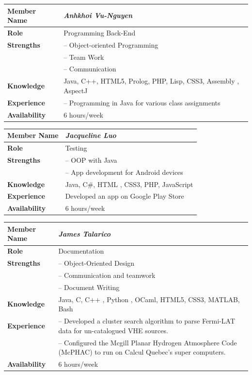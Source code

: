 \documentclass[12pt]{article}
\begin{document}
%
\begin{center}
\begin{tabular}{ p{2.7cm} | p{9cm} }
\hline
\textbf{Member Name}	&	\textit{\textbf{Anhkhoi Vu-Nguyen}}	\\ \hline \hline
\textbf{Role}		&	Programming Back-End	\\ \hline
\textbf{Strengths}	&	-- Object-oriented Programming	\\
			&	-- Team Work	\\
			&	-- Communication	\\ \hline
\textbf{Knowledge}	&	Java, C++, HTML5, Prolog, PHP, Lisp, CSS3, Assembly , AspectJ	\\ \hline
\textbf{Experience}	&	-- Programming in Java for various class assignments 	\\ \hline
\textbf{Availability}	&	6 hours/week	\\ \hline
\end{tabular}
\end{center}
%
\vspace{3mm}
%
\begin{center}
\begin{tabular}{ p{2.7cm} | p{9cm} }
\hline
\textbf{Member Name}	&	\textit{\textbf{Jacqueline Luo}}	\\ \hline \hline
\textbf{Role}		&	Testing	\\ \hline
\textbf{Strengths}	&	-- OOP with Java	\\
			&	-- App development for Android devices	\\ \hline
\textbf{Knowledge}	&	Java, C\#, HTML , CSS3, PHP, JavaScript	\\ \hline
\textbf{Experience}	&	Developed an app on Google Play Store	\\ \hline
\textbf{Availability}	&	6 hours/week	\\ \hline
\end{tabular}
\end{center}
%
\vspace{3mm}
%
\begin{center}
\begin{tabular}{ p{2.7cm} | p{9cm} }
\hline
\textbf{Member Name}	&	\textit{\textbf{James Talarico}}	\\ \hline \hline
\textbf{Role}		&	Documentation	\\ \hline
\textbf{Strengths}	&	-- Object-Oriented Design	\\
			&	-- Communication and teamwork	\\
			&	-- Document Writing	\\ \hline
\textbf{Knowledge}	&	Java, C, C++ , Python , OCaml, HTML5, CSS3, MATLAB, Bash	\\ \hline
\textbf{Experience}	&	-- Developed a cluster search algorithm to parse Fermi-LAT data for un-catalogued VHE sources.	\\
			&	-- Configured the Mcgill Planar Hydrogen Atmosphere Code (McPHAC) to run on Calcul Quebec's super computers.	\\ \hline
\textbf{Availability}	&	6 hours/week	\\ \hline
\end{tabular}
\end{center}
\end{document}
